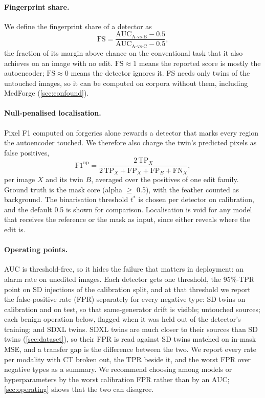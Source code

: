 \paragraph{Fingerprint share.}
We define the fingerprint share of a detector as
\begin{equation}
\mathrm{FS} = \frac{\mathrm{AUC}_{\text{A-vs-B}} - 0.5}{\mathrm{AUC}_{\text{A-vs-C}} - 0.5},
\label{eq:fs}
\end{equation}
the fraction of its margin above chance on the conventional task that it also achieves on an image with no edit.
$\mathrm{FS}\approx1$ means the reported score is mostly the autoencoder; $\mathrm{FS}\approx0$ means the detector ignores it.
FS needs only twins of the untouched images, so it can be computed on corpora without them, including MedForge (\cref{sec:confound}).

\paragraph{Null-penalised localisation.}
Pixel F1 computed on forgeries alone rewards a detector that marks every region the autoencoder touched.
We therefore also charge the twin's predicted pixels as false positives,
\begin{equation}
\mathrm{F1}^{\text{np}} = \frac{2\,\mathrm{TP}_X}{2\,\mathrm{TP}_X + \mathrm{FP}_X + \mathrm{FP}_B + \mathrm{FN}_X},
\label{eq:np}
\end{equation}
per image $X$ and its twin $B$, averaged over the positives of one edit family.
Ground truth is the mask core (alpha $\geq$ 0.5), with the feather counted as background.
The binarisation threshold $t^\ast$ is chosen per detector on calibration, and the default 0.5 is shown for comparison.
Localisation is void for any model that receives the reference or the mask as input, since either reveals where the edit is.

\paragraph{Operating points.}
AUC is threshold-free, so it hides the failure that matters in deployment: an alarm rate on unedited images.
Each detector gets one threshold, the 95\%-TPR point on SD injections of the calibration split, %
and at that threshold we report the false-positive rate (FPR) separately for every negative type: SD twins on calibration and on test, so that same-generator drift is visible; untouched sources; each benign operation below, flagged when it was held out of the detector's training; and SDXL twins.
SDXL twins are much closer to their sources than SD twins (\cref{sec:dataset}), so their FPR is read against SD twins matched on in-mask MSE, and a transfer gap is the difference between the two.
We report every rate per modality with CT broken out, the TPR beside it, and the worst FPR over negative types as a summary.
We recommend choosing among models or hyperparameters by the worst calibration FPR rather than by an AUC; \cref{sec:operating} shows that the two can disagree.

